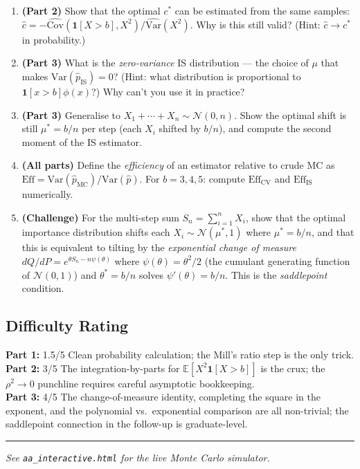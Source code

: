 \documentclass[12pt]{article}
\begin{document}
\begin{enumerate}
  \item \textbf{(Part 2)} Show that the optimal $c^*$ can be estimated from the same samples:
  $\hat{c} = -\widehat{\mathrm{Cov}}(\mathbf{1}[X>b], X^2) / \widehat{\mathrm{Var}}(X^2)$.
  Why is this still valid?  (Hint: $\hat{c} \to c^*$ in probability.)

  \item \textbf{(Part 3)} What is the \emph{zero-variance} IS distribution --- the choice of
  $\mu$ that makes $\mathrm{Var}(\hat{p}_{\mathrm{IS}}) = 0$?
  (Hint: what distribution is proportional to $\mathbf{1}[x > b]\phi(x)$?)
  Why can't you use it in practice?

  \item \textbf{(Part 3)} Generalise to $X_1 + \cdots + X_n \sim \mathcal{N}(0,n)$.
  Show the optimal shift is still $\mu^* = b/n$ per step (each $X_i$ shifted by $b/n$),
  and compute the second moment of the IS estimator.

  \item \textbf{(All parts)} Define the \emph{efficiency} of an estimator relative to crude MC as
  $\mathrm{Eff} = \mathrm{Var}(\hat{p}_{\mathrm{MC}}) / \mathrm{Var}(\hat{p})$.
  For $b = 3, 4, 5$: compute $\mathrm{Eff}_{\mathrm{CV}}$ and $\mathrm{Eff}_{\mathrm{IS}}$ numerically.

  \item \textbf{(Challenge)} For the multi-step sum $S_n = \sum_{i=1}^n X_i$,
  show that the optimal importance distribution shifts each $X_i \sim \mathcal{N}(\mu^*, 1)$
  where $\mu^* = b/n$, and that this is equivalent to tilting by the
  \emph{exponential change of measure} $dQ/dP = e^{\theta S_n - n\psi(\theta)}$
  where $\psi(\theta) = \theta^2/2$ (the cumulant generating function of $\mathcal{N}(0,1)$)
  and $\theta^* = b/n$ solves $\psi'(\theta) = b/n$.
  This is the \emph{saddlepoint} condition.
\end{enumerate}

\subsection*{Difficulty Rating}
\textbf{Part 1:} 1.5/5 \quad Clean probability calculation; the Mill's ratio step is the only trick.\\
\textbf{Part 2:} 3/5 \quad The integration-by-parts for $\mathbb{E}[X^2\mathbf{1}[X>b]]$ is the crux;
the $\rho^2 \to 0$ punchline requires careful asymptotic bookkeeping.\\
\textbf{Part 3:} 4/5 \quad The change-of-measure identity, completing the square in the exponent,
and the polynomial vs.\ exponential comparison are all non-trivial;
the saddlepoint connection in the follow-up is graduate-level.

\bigskip\hrule\bigskip

\begin{center}
  \textit{See \texttt{aa\_interactive.html} for the live Monte Carlo simulator.}
\end{center}
\end{document}
